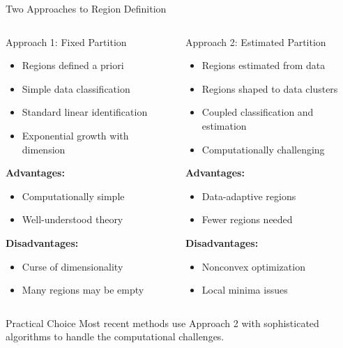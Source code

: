 \documentclass[aspectratio=169]{beamer}
\begin{document}
\begin{frame}{Two Approaches to Region Definition}
\begin{columns}[t]
\begin{column}{0.5\textwidth}
\begin{block}{Approach 1: Fixed Partition}
\begin{itemize}
\item Regions defined a priori
\item Simple data classification
\item Standard linear identification
\item Exponential growth with dimension
\end{itemize}

\textbf{Advantages:}
\begin{itemize}
\item Computationally simple
\item Well-understood theory
\end{itemize}

\textbf{Disadvantages:}
\begin{itemize}
\item Curse of dimensionality
\item Many regions may be empty
\end{itemize}
\end{block}
\end{column}
\begin{column}{0.5\textwidth}
\begin{block}{Approach 2: Estimated Partition}
\begin{itemize}
\item Regions estimated from data
\item Regions shaped to data clusters
\item Coupled classification and estimation
\item Computationally challenging
\end{itemize}

\textbf{Advantages:}
\begin{itemize}
\item Data-adaptive regions
\item Fewer regions needed
\end{itemize}

\textbf{Disadvantages:}
\begin{itemize}
\item Nonconvex optimization
\item Local minima issues
\end{itemize}
\end{block}
\end{column}
\end{columns}

\vspace{0.3cm}
\begin{exampleblock}{Practical Choice}
Most recent methods use Approach 2 with sophisticated algorithms to handle the computational challenges.
\end{exampleblock}
\end{frame}
\end{document}
